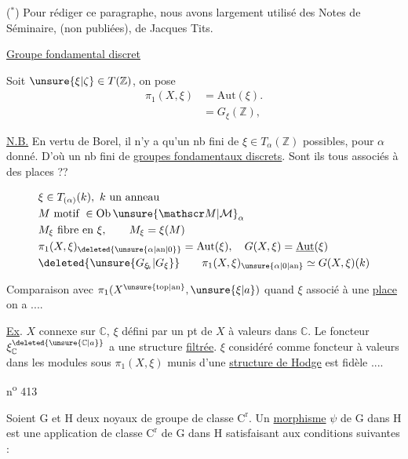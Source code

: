 \noindent\makebox[\linewidth][s]{- - - - - - - - - - - - - - - - - - - - - - - - - - - - - - - - - - - - - - - - -}

($^{*}$) Pour rédiger ce paragraphe, nous avons largement utilisé des Notes de Séminaire, (non publiées), de Jacques Tits.

\uline{Groupe fondamental  discret}

Soit $\unsure{\xi|\zeta}\in T(\mathbb Z)$, on pose
\[
\begin{aligned}
\pi_1(X,\xi)&=\mathrm{Aut}(\xi).\\
             &=G_{\xi}(\mathbb Z),
\end{aligned}
\]

\uline{N.B.} En vertu de Borel, il n'y a qu'un nb fini de $\xi\in T_{\alpha}(\mathbb Z)$ possibles, pour $\alpha$ donné. D'où un nb fini de \uline{groupes fondamentaux discrets}. Sont ils tous associés à des  places ??

\[
\begin{aligned}
&\xi\in T_{(\alpha)}(k),\ k\text{ un anneau}\\
&M\text{ motif }\in\mathrm{Ob}\,\unsure{\mathscr M|\mathcal M}_{\alpha}\\
&M_{\xi}\text{ fibre en }\xi,\qquad M_{\xi}=\xi(M)\\
&\pi_1(X,\xi)_{\deleted{\unsure{\alpha|\mathrm{an}|0}}}=\mathrm{Aut}(\xi),\quad
G(X,\xi)=\underline{\mathrm{Aut}}(\xi)\\
&\deleted{\unsure{G_{\xi_{\!k}}|G_{\xi}}}\qquad \pi_1(X,\xi)_{\unsure{\alpha|0|\mathrm{an}}}\simeq G(X,\xi)(k)
\end{aligned}
\]

Comparaison avec $\pi_1(X^{\unsure{\mathrm{top}|\mathrm{an}}},\unsure{\xi|a})$ quand $\xi$ associé à une \uline{place} on a ....

\uline{Ex}. $X$ connexe sur $\mathbb C$, $\xi$ défini par un pt de $X$ à valeurs dans $\mathbb C$. Le foncteur $\xi_{\mathbb C}^{\deleted{\unsure{\mathbb C|a}}}$ a une structure \uline{filtrée}. $\xi$ considéré comme foncteur à valeurs dans les modules sous $\pi_1(X,\xi)$ munis d'une \uline{structure de Hodge} est  fidèle ....

\hfill n\textsuperscript{o} 413

Soient $\mathrm G$ et $\mathrm H$ deux noyaux de groupe de classe $\mathrm C^{\mathrm r}$. Un \uline{morphisme} $\psi$ de $\mathrm G$ dans $\mathrm H$ est une application de classe $\mathrm C^{\mathrm r}$ de $\mathrm G$ dans $\mathrm H$ satisfaisant aux conditions suivantes :

